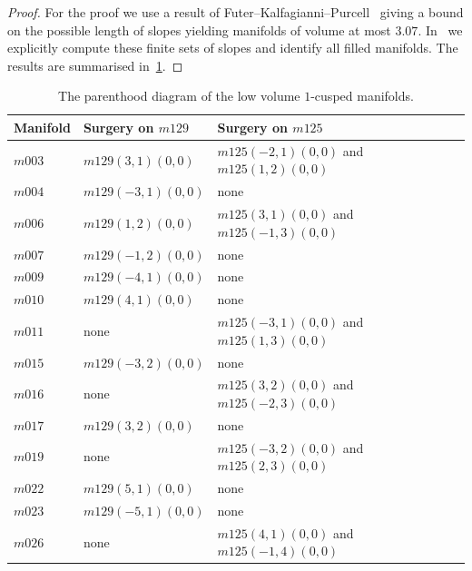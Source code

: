 \documentclass[a4paper]{gtart}
\theoremstyle{definition}
\theoremstyle{remark}
\numberwithin{equation}{section}
\begin{document}
\begin{proof}
	For the proof we use a result of Futer--Kalfagianni--Purcell~\cite{FuterKalfagianniPurcell} giving a bound on the possible length of slopes yielding manifolds of volume at most $3.07$. In~\cite{data} we explicitly compute these finite sets of slopes and identify all filled manifolds. The results are summarised in~\cref{tab:parent}.
\end{proof}

\begin{table}[htbp]
	\caption{The parenthood diagram of the low volume $1$-cusped manifolds. \label{tab:whichone}}
	\label{tab:parent}
	\begin{tabular}{lll}
		Manifold & Surgery on $m129$ &Surgery on $m125$ \\
		\toprule	
		$m003$ & $m129(3, 1)  (0,0)$ & $m125(-2, 1)(0,0)$ and $m125(1, 2)(0,0)$\\ 
		
		$m004$ & $m129(-3, 1) (0,0)$ & none \\  
		
		$m006$ & $m129(1, 2) (0,0)$ & $m125(3, 1)(0,0)$ and $m125(-1, 3)(0,0)$\\  
		
		$m007$ & $m129(-1, 2) (0,0)$ & none \\ 
		
		$m009$ & $m129(-4, 1) (0,0)$ & none \\ 
		
		$m010$ & $m129(4, 1) (0,0)$ & none \\ 
		
		$m011$ & none & $m125(-3, 1) (0,0)$ and $m125(1, 3)(0,0)$\\ 
		
		$m015$ & $m129(-3, 2) (0,0)$ & none\\  
		
		$m016$ & none & $m125(3, 2)(0,0)$ and $m125(-2, 3)(0,0)$\\ 
		
		$m017$ & $m129(3, 2) (0,0)$ & none \\  
		
		$m019$ & none & $m125(-3, 2)(0,0)$ and $m125(2, 3)(0,0)$ \\ 
		
		$m022$ & $m129(5, 1)  (0,0)$ & none \\  
		
		$m023$ & $m129(-5, 1)  (0,0)$ & none \\  
		
		$m026$ &none & $m125(4, 1)(0,0)$ and $m125(-1, 4)(0,0)$\\ 
		\bottomrule
	\end{tabular}
\end{table}
\end{document}
